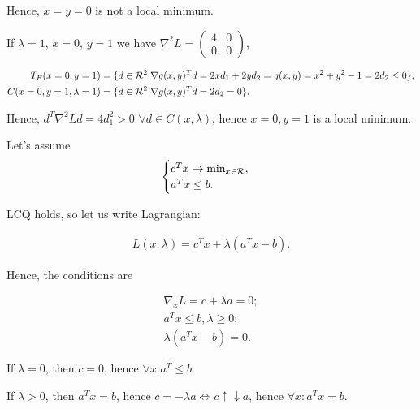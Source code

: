 \begin{eexl}
    Hence, $x = y = 0$ is not a local minimum. 

    If $\lambda = 1$, $x = 0$, $y = 1$ we have $\nabla^2 L = \begin{pmatrix} 4 & 0 \\ 0 & 0 \end{pmatrix}$,

    \begin{equation*}
        \begin{aligned}
            T_F (x = 0, y = 1) &= \{d \in \mathcal{R}^2 | \nabla g(x, y)^T d = 2x d_1 + 2y d_2 = g(x, y) = x^2 + y^2 - 1 = 2d_2 \leq 0 \} ; \\ 
            C(x = 0, y = 1, \lambda = 1) &= \{d \in \mathcal{R}^2 | \nabla g(x, y)^T d = 2d_2 = 0 \}.
        \end{aligned}
    \end{equation*}

    Hence, $d^T \nabla^2 L d = 4 d_1^2 >0$ $\forall d \in C(x, \lambda)$, hence $x = 0, y = 1$ is a local minimum.
\end{eexl}

\begin{eexl}
    Let's assume 
    \begin{equation*}
        \begin{cases}
            c^T x \to \min_{x \in\mathcal{R}}, \\
            a^T x \leq b.
        \end{cases}
    \end{equation*}

    LCQ holds, so let us write Lagrangian:

    \begin{equation*}
        \begin{aligned}
            L(x, \lambda) = c^T x + \lambda (a^T x - b).
        \end{aligned}
    \end{equation*}

    Hence, the conditions are

    \begin{equation*}
        \begin{aligned}
            \nabla_x L = c + \lambda a = 0; \\ 
            a^T x \leq b, \lambda \geq 0; \\ 
            \lambda (a^T x - b) = 0.
        \end{aligned}
    \end{equation*}

    If $\lambda = 0$, then $c = 0$, hence $\forall x$ $a^T \leq b$. 

    If $\lambda > 0$, then $a^T x = b$, hence $c = - \lambda a \Leftrightarrow c \uparrow \downarrow a$, hence $\forall x: a^T x = b$. 
\end{eexl}

